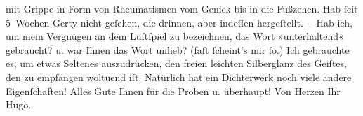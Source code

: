 \begin{ledgroupsized}[t]{13cm}
               mit Grippe in Form von Rheumatismen vom Genick bis in die Fußzehen. \pend
           \pstart
           {\pb}Hab ſeit 5 Wochen Gerty nicht geſehen, die drinnen, aber indeſſen
               hergeſtellt. – Hab ich, um mein Vergnügen an dem Luſtſpiel zu bezeichnen, das Wort »unterhaltend« gebraucht?
               u. war Ihnen das Wort unlieb? (faſt ſcheint’s mir ſo.) Ich gebrauchte es, um etwas
               Seltenes auszudrücken, den freien leichten Silberglanz des Geiſtes, den zu empfangen
               woltuend iſt. Natürlich hat ein Dichterwerk noch viele andere Eigenſchaften!\pend
           \pstart
           Alles Gute Ihnen für die Proben u. überhaupt! Von Herzen Ihr{\\}\spacefill\mbox{Hugo.}\pend
           
         
         \endnumbering{}\end{ledgroupsized}  \newcommand{\dateiname}{L02338}\newcommand{\titel}{Hugo Hofmannsthal an Arthur Schnitzler, 13. 3. 1920}\newcommand{\editorInnen}{Martin Anton Müller und Gerd-Hermann Susen}
      
